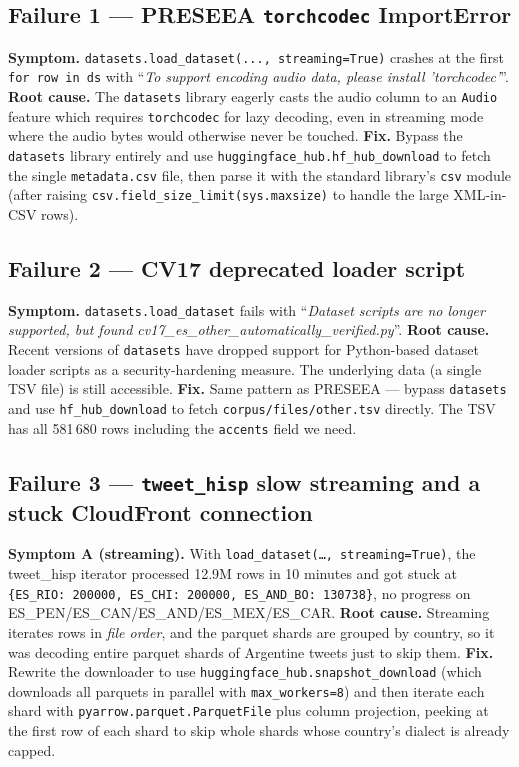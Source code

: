 \documentclass[11pt,a4paper]{article}
\begin{document}
\subsection{Failure 1 --- PRESEEA \texttt{torchcodec} ImportError}

\textbf{Symptom.} \texttt{datasets.load\_dataset(..., streaming=True)}
crashes at the first \texttt{for row in ds} with
``\emph{To support encoding audio data, please install 'torchcodec'}''.
\textbf{Root cause.} The \texttt{datasets} library eagerly casts the
audio column to an \texttt{Audio} feature which requires
\texttt{torchcodec} for lazy decoding, even in streaming mode where the
audio bytes would otherwise never be touched.
\textbf{Fix.} Bypass the \texttt{datasets} library entirely and use
\texttt{huggingface\_hub.hf\_hub\_download} to fetch the single
\texttt{metadata.csv} file, then parse it with the standard library's
\texttt{csv} module (after raising
\texttt{csv.field\_size\_limit(sys.maxsize)} to handle the large
XML-in-CSV rows).

\subsection{Failure 2 --- CV17 deprecated loader script}

\textbf{Symptom.} \texttt{datasets.load\_dataset} fails with
``\emph{Dataset scripts are no longer supported, but found
cv17\_es\_other\_automatically\_verified.py}''.
\textbf{Root cause.} Recent versions of \texttt{datasets} have dropped
support for Python-based dataset loader scripts as a security-hardening
measure. The underlying data (a single TSV file) is still accessible.
\textbf{Fix.} Same pattern as PRESEEA --- bypass \texttt{datasets} and
use \texttt{hf\_hub\_download} to fetch \texttt{corpus/files/other.tsv}
directly. The TSV has all 581\,680 rows including the
\texttt{accents} field we need.

\subsection{Failure 3 --- \texttt{tweet\_hisp} slow streaming and a stuck CloudFront connection}

\textbf{Symptom A (streaming).} With
\texttt{load\_dataset(\ldots, streaming=True)}, the tweet\_hisp iterator
processed 12.9M rows in 10 minutes and got stuck at
\texttt{\{ES\_RIO: 200000, ES\_CHI: 200000, ES\_AND\_BO: 130738\}}, no
progress on ES\_PEN/ES\_CAN/ES\_AND/ES\_MEX/ES\_CAR.
\textbf{Root cause.} Streaming iterates rows in \emph{file order}, and
the parquet shards are grouped by country, so it was
decoding entire parquet shards of Argentine tweets just to skip them.
\textbf{Fix.} Rewrite the downloader to use
\texttt{huggingface\_hub.snapshot\_download} (which downloads all
parquets in parallel with \texttt{max\_workers=8}) and then iterate each
shard with \texttt{pyarrow.parquet.ParquetFile} plus column projection,
peeking at the first row of each shard to skip whole shards whose
country's dialect is already capped.
\end{document}
